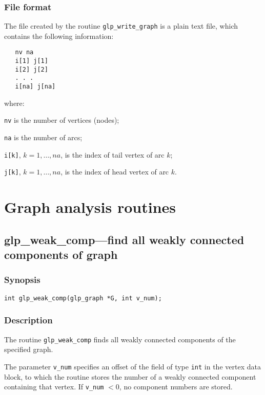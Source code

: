 \subsubsection*{File format}

The file created by the routine \verb|glp_write_graph| is a plain text
file, which contains the following information:

\begin{verbatim}
   nv na
   i[1] j[1]
   i[2] j[2]
   . . .
   i[na] j[na]
\end{verbatim}

\noindent
where:

\noindent
\verb|nv| is the number of vertices (nodes);

\noindent
\verb|na| is the number of arcs;

\noindent
\verb|i[k]|, $k=1,\dots,na$, is the index of tail vertex of arc $k$;

\noindent
\verb|j[k]|, $k=1,\dots,na$, is the index of head vertex of arc $k$.

\newpage

\section{Graph analysis routines}

\subsection{glp\_weak\_comp---find all weakly connected components of
graph}

\subsubsection*{Synopsis}

\begin{verbatim}
int glp_weak_comp(glp_graph *G, int v_num);
\end{verbatim}

\subsubsection*{Description}

The routine \verb|glp_weak_comp| finds all weakly connected components
of the specified graph.

The parameter \verb|v_num| specifies an offset of the field of type
\verb|int| in the vertex data block, to which the routine stores the
number of a weakly connected component containing that vertex. If
\verb|v_num| $<0$, no component numbers are stored.

